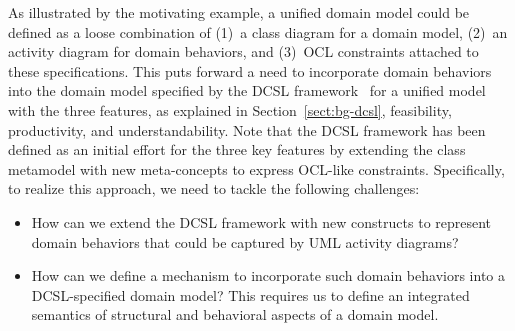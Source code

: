 As illustrated by the motivating example, a unified domain model could be defined as a loose combination of (1)~a class diagram for a domain model, (2)~an activity diagram for domain behaviors, and (3)~OCL constraints attached to these specifications. This puts forward a need to incorporate domain behaviors into the domain model specified by the DCSL framework~\cite{le_domain_2018} for a unified model with the three features, as explained in Section~\ref{sect:bg-dcsl}, feasibility, productivity, and understandability. Note that the DCSL framework has been defined as an initial effort for the three key features by extending the class metamodel with new meta-concepts to express OCL-like constraints.
Specifically, to realize this approach, we need to tackle the following challenges:

\begin{itemize}
    \item How can we extend the DCSL framework with new constructs to represent domain behaviors that could be captured by UML activity diagrams?
    \item How can we define a mechanism to incorporate such domain behaviors into a DCSL-specified domain model? This requires us to define an integrated semantics of structural and behavioral aspects of a domain model.
\end{itemize}


